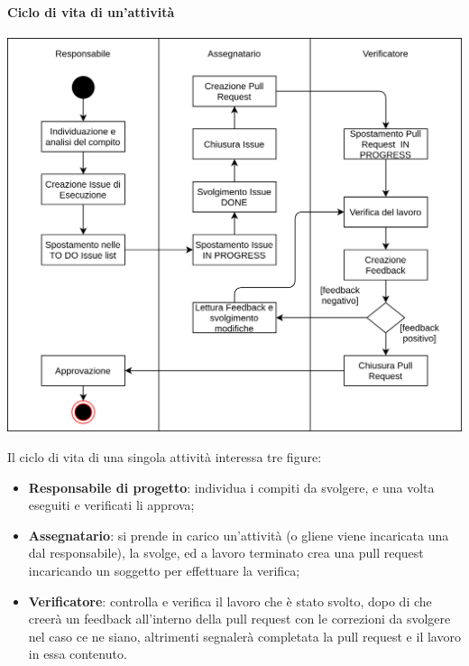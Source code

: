 \paragraph{Ciclo di vita di un'attività} \label{_cicloVitaAttivita}
\begin{center}
    \includegraphics[scale=0.8]{res/images/ciclo_vita_ticket.png}
\end{center}
Il ciclo di vita di una singola attività interessa tre figure:
\begin{itemize}
    \item \textbf{Responsabile di progetto}: individua i compiti da svolgere, e una volta eseguiti e verificati li approva;
    \item \textbf{Assegnatario}: si prende in carico un'attività (o gliene viene incaricata una dal responsabile), la svolge, ed a lavoro terminato crea una pull request incaricando un soggetto per effettuare la verifica;
    \item \textbf{Verificatore}: controlla e verifica il lavoro che è stato svolto, dopo di che creerà un feedback all'interno della pull request con le correzioni da svolgere nel caso ce ne siano, altrimenti segnalerà completata la pull request e il lavoro in essa contenuto.
\end{itemize}

